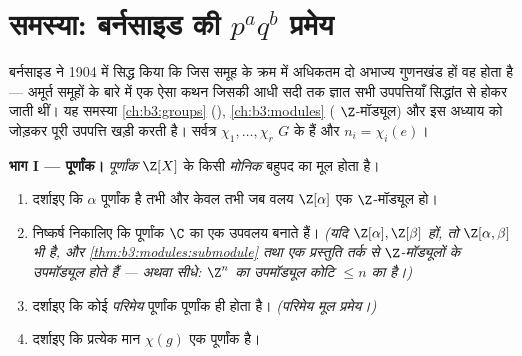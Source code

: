 \section{समस्या: बर्नसाइड की \texorpdfstring{$p^aq^b$}{p^a q^b} प्रमेय}

\begin{problem}[{सप्ताहांत समस्या --- क्रम $p^aq^b$ के समूहों की
विलेयता}]\label{pb:b3:representations:1}
बर्नसाइड ने 1904 में सिद्ध किया कि जिस समूह के क्रम में अधिकतम
दो अभाज्य गुणनखंड हों वह  होता है --- अमूर्त समूहों के बारे
में एक ऐसा कथन जिसकी आधी सदी तक ज्ञात सभी उपपत्तियाँ 
सिद्धांत से होकर जाती थीं। यह समस्या \cref{ch:b3:groups} (), \cref{ch:b3:modules}
( $\Z$-मॉड्यूल) और इस अध्याय को जोड़कर पूरी उपपत्ति
खड़ी करती है। सर्वत्र $\chi_1, \dots, \chi_r$ $G$ के   हैं और $n_i = \chi_i(e)$।

\medskip
\noindent\textbf{भाग I ---  पूर्णांक।} \emph{
पूर्णांक} $\Z[X]$ के किसी \emph{मोनिक} बहुपद का मूल होता है।
\begin{enumerate}
  \item दर्शाइए कि $\alpha$  पूर्णांक है तभी और केवल तभी जब
        वलय $\Z[\alpha]$ एक  $\Z$-मॉड्यूल हो।
  \item निष्कर्ष निकालिए कि  पूर्णांक $\C$ का एक उपवलय
        बनाते हैं। \emph{(यदि $\Z[\alpha], \Z[\beta]$  हों, तो $\Z[\alpha, \beta]$
        भी है, और \cref{thm:b3:modules:submodule} तथा एक प्रस्तुति तर्क से 
        $\Z$-मॉड्यूलों के उपमॉड्यूल  होते हैं ---
        अथवा सीधे: $\Z^n$ का उपमॉड्यूल कोटि $\leq n$ का  है।)}
  \item दर्शाइए कि कोई \emph{परिमेय}  पूर्णांक पूर्णांक ही
        होता है। \emph{(परिमेय मूल प्रमेय।)}
  \item दर्शाइए कि प्रत्येक  मान $\chi(g)$ एक  पूर्णांक है।
\end{enumerate}


\end{problem}
